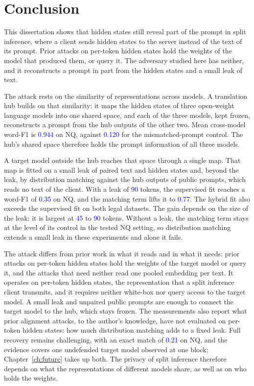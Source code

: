 \providecommand{\vf}[1]{\textcolor{blue}{#1}}
\chapter{Conclusion}\label{ch:conclusion}

This dissertation shows that hidden states still reveal part of the prompt in split inference, where a client sends hidden states to the server instead of the text of its prompt.
Prior attacks on per-token hidden states hold the weights of the model that produced them, or query it.
The adversary studied here has neither, and it reconstructs a prompt in part from the hidden states and a small leak of text.

The attack rests on the similarity of representations across models.
A translation hub builds on that similarity: it maps the hidden states of three open-weight language models into one shared space, and each of the three models, kept frozen, reconstructs a prompt from the hub outputs of the other two.
Mean cross-model word-F1 is \vf{0.944} on NQ, against \vf{0.120} for the mismatched-prompt control.
The hub's shared space therefore holds the prompt information of all three models.

A target model outside the hub reaches that space through a single map.
That map is fitted on a small leak of paired text and hidden states and, beyond the leak, by distribution matching against the hub outputs of public prompts, which reads no text of the client.
With a leak of \vf{90} tokens, the supervised fit reaches a word-F1 of \vf{0.35} on NQ, and the matching term lifts it to \vf{0.77}.
The hybrid fit also exceeds the supervised fit on both legal datasets.
The gain depends on the size of the leak: it is largest at \vf{45} to \vf{90} tokens.
Without a leak, the matching term stays at the level of its control in the tested NQ setting, so distribution matching extends a small leak in these experiments and alone it fails.

The attack differs from prior work in what it reads and in what it needs: prior attacks on per-token hidden states hold the weights of the target model or query it, and the attacks that need neither read one pooled embedding per text.
It operates on per-token hidden states, the representation that a split inference client transmits, and it requires neither white-box nor query access to the target model.
A small leak and unpaired public prompts are enough to connect the target model to the hub, which stays frozen.
The measurements also report what prior alignment attacks, to the author's knowledge, have not evaluated on per-token hidden states: how much distribution matching adds to a fixed leak.
Full recovery remains challenging, with an exact match of \vf{0.21} on NQ, and the evidence covers one undefended target model observed at one block; Chapter~\ref{ch:future} takes up both.
The privacy of split inference therefore depends on what the representations of different models share, as well as on who holds the weights.
